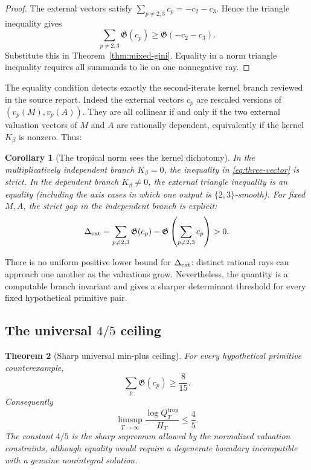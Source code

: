 \documentclass[11pt,oneside]{article}
\newtheorem{theorem}{Theorem}[section]
\newtheorem{corollary}[theorem]{Corollary}
\theoremstyle{definition}
\theoremstyle{remark}
\begin{document}
\begin{proof}
The external vectors satisfy
$\sum_{p\ne2,3}c_p=-c_2-c_3$.  Hence the triangle inequality gives
\[
 \sum_{p\ne2,3}\mathfrak G(c_p)
 \ge\mathfrak G(-c_2-c_3).
\]
Substitute this in Theorem~\ref{thm:mixed-gini}.  Equality in a norm triangle inequality
requires all summands to lie on one nonnegative ray.
\end{proof}

The equality condition detects exactly the second-iterate kernel branch reviewed in the source
report.  Indeed the external vectors $c_p$ are rescaled versions of
$(v_p(M),v_p(A))$.  They are all collinear if and only if the two external valuation vectors
of $M$ and $A$ are rationally dependent, equivalently if the kernel $K_\beta$ is nonzero.
Thus:

\begin{corollary}[The tropical norm sees the kernel dichotomy]\label{cor:gini-kernel}
In the multiplicatively independent branch $K_\beta=0$, the inequality in
\eqref{eq:three-vector} is strict.  In the dependent branch $K_\beta\ne0$, the external
triangle inequality is an equality (including the axis cases in which one output is
$\{2,3\}$-smooth).  For fixed $M,A$, the strict gap in the independent branch is explicit:
\begin{equation}\label{eq:external-angular-defect}
 \Delta_{\rm ext}
 =\sum_{p\ne2,3}\mathfrak G(c_p)
  -\mathfrak G\left(\sum_{p\ne2,3}c_p\right)>0.
\end{equation}
\end{corollary}

There is no uniform positive lower bound for $\Delta_{\rm ext}$: distinct rational rays can
approach one another as the valuations grow.  Nevertheless, the quantity is a computable
branch invariant and gives a sharper determinant threshold for every fixed hypothetical
primitive pair.

\subsection{The universal \texorpdfstring{$4/5$}{4/5} ceiling}

\begin{theorem}[Sharp universal min-plus ceiling]\label{thm:four-fifths}
For every hypothetical primitive counterexample,
\begin{equation}\label{eq:G-lower}
  \sum_p\mathfrak G(c_p)\ge\frac8{15}.
\end{equation}
Consequently
\begin{equation}\label{eq:four-fifths}
 \limsup_{T\to\infty}
 \frac{\log Q_T^{\mathrm{trop}}}{H_T}
 \le\frac45.
\end{equation}
The constant $4/5$ is the sharp supremum allowed by the normalized valuation constraints,
although equality would require a degenerate boundary incompatible with a genuine
nonintegral solution.
\end{theorem}
\end{document}
